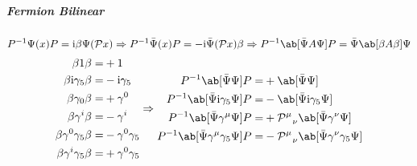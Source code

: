 \documentclass{article}
\newcommand{\calP}{\mathcal{P}}
\newcommand{\gammafive}{\gamma_5}
\newcommand{\gammamu}{\gamma^{\mu}}
\newcommand{\gammanu}{\gamma^{\nu}}
\newcommand{\rmi}{\mathrm{i}}
\begin{document}
\subparagraph{Fermion Bilinear}

\[ P^{-1} \Psi(x) P = \rmi \beta \Psi(\calP x) \Rightarrow P^{-1} \bar{\Psi}(x) P = - \rmi \bar{\Psi}(\calP x) \beta \Rightarrow P^{-1} \ab[\bar{\Psi} A \Psi] P = \bar{\Psi} \ab[\beta A \beta] \Psi \]
\[ \begin{aligned}
        \beta 1 \beta =                   & +1                    \\
        \beta \rmi \gammafive \beta =     & - \rmi \gammafive     \\
        \beta \gamma_0 \beta =            & + \gamma^0            \\
        \beta \gamma^i \beta =            & - \gamma^i            \\
        \beta \gamma^0 \gammafive \beta = & - \gamma^0 \gammafive \\
        \beta \gamma^i \gammafive \beta = & + \gamma^0 \gammafive
    \end{aligned} \Rightarrow \begin{aligned}
        P^{-1} \ab[\bar{\Psi} \Psi] P =                     & + \ab[\bar{\Psi} \Psi]                                           \\
        P^{-1} \ab[\bar{\Psi} \rmi \gammafive \Psi] P =     & - \ab[\bar{\Psi} \rmi \gammafive \Psi]                           \\
        P^{-1} \ab[\bar{\Psi} \gammamu \Psi] P =            & + \calP^{\mu}_{\ \ \nu} \ab[\bar{\Psi} \gammanu \Psi]            \\
        P^{-1} \ab[\bar{\Psi} \gammamu \gammafive \Psi] P = & - \calP^{\mu}_{\ \ \nu} \ab[\bar{\Psi} \gammanu \gammafive \Psi]
    \end{aligned} \]
\end{document}
